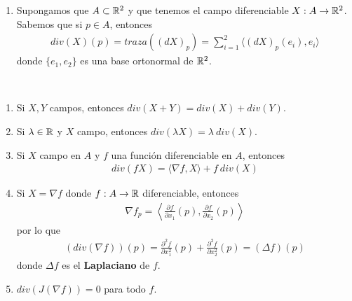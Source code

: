 \begin{observacion}
\begin{enumerate}
        Supongamos que $\alpha: \bb{R} \to \bb{R}^2$ es una parametrización regular \underline{no parametrizada por el arco} en general, $A$-periódica, con $\alpha_{|_{[0,A)}}$ inyectiva, $tr(\alpha)=C$ y tal que $\alpha$ orienta positivamente a $C$. El teorema de la divergencia se escribirá de la siguiente forma:
        \begin{gather*}
            \int_\Omega div(X) = - \int_C \langle X,N \rangle = - \int_0^A \langle X_{\alpha(t)}, J\alpha'(t)\rangle dt
        \end{gather*}
        Esto se puede ver aplicando el \hyperref[teo:cambio_variable]{Teorema de Cambio de Variable} al \hyperref[teo:area]{Teorema del Área} (se deja como ejercicio el cálculo concreto).

        \item Supongamos que $A\subset \mathbb{R}^2$ y que tenemos el campo diferenciable $X: A \to \mathbb{R}^2$. Sabemos que si $p\in A$, entonces
        \begin{gather*}
            div(X)(p) = traza((dX)_p) = \sum_{i=1}^2 \langle (dX)_p(e_i), e_i \rangle
        \end{gather*}
        donde $\{e_1, e_2\}$ es una base ortonormal de $\mathbb{R}^2$.
    \end{enumerate}
\end{observacion}

\begin{propiedades}\
    \begin{enumerate}
        \item Si $X,Y$ campos, entonces $div(X+Y)=div(X)+div(Y)$.
        \item Si $\lambda\in \mathbb{R}$ y $X$ campo, entonces $div(\lambda X) = \lambda\ div(X)$.
        \item Si $X$ campo en $A$ y $f$ una función diferenciable en $A$, entonces
        \begin{gather*}
            div(fX) = \langle \nabla f, X \rangle + f\ div(X)
        \end{gather*}
        \item Si $X=\nabla f$ donde $f:A\to \mathbb{R}$ diferenciable, entonces
        \begin{gather*}
            \nabla f_p = \left\langle \frac{\partial f}{\partial x_1}(p), \frac{\partial f}{\partial x_2}(p) \right\rangle
        \end{gather*}
        por lo que 
        \begin{gather*}
            (div (\nabla f))(p) = \frac{\partial^2 f}{\partial x_1^2}(p) + \frac{\partial^2 f}{\partial x_2^2}(p) = (\Delta f)(p)
        \end{gather*}
        donde $\Delta f$ es el \textbf{Laplaciano} de $f$.
        \item $div(J(\nabla f)) = 0$ para todo $f$.
    \end{enumerate}
\end{propiedades}

